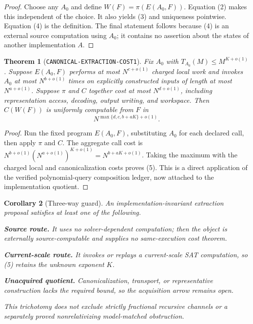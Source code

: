 \documentclass[11pt]{article}
\newtheorem{theorem}{Theorem}
\newtheorem{corollary}[theorem]{Corollary}
\begin{document}
\begin{proof}
Choose any $A_0$ and define $W(F)=\pi(E(A_0,F))$.  Equation (2) makes this
independent of the choice.  It also yields (3) and uniqueness pointwise.
Equation (4) is the definition.  The final statement follows because (4) is
an external source computation using $A_0$; it contains no assertion about
the states of another implementation $A$.
\end{proof}

\begin{theorem}[\texttt{CANONICAL-EXTRACTION-COST1}]
Fix $A_0$ with $T_{A_0}(M)\le M^{K+o(1)}$.  Suppose $E(A_0,F)$ performs at
most $N^{c+o(1)}$ charged local work and invokes $A_0$ at most
$N^{b+o(1)}$ times on explicitly constructed inputs of length at most
$N^{a+o(1)}$.  Suppose $\pi$ and $C$ together cost at most $N^{d+o(1)}$,
including representation access, decoding, output writing, and workspace.
Then $C(W(F))$ is uniformly computable from $F$ in
\[
 \boxed{N^{\max\{d,c,b+aK\}+o(1)}}.                       \tag{5}
\]
\end{theorem}

\begin{proof}
Run the fixed program $E(A_0,F)$, substituting $A_0$ for each declared call,
then apply $\pi$ and $C$.  The aggregate call cost is
$N^{b+o(1)}(N^{a+o(1)})^{K+o(1)}=N^{b+aK+o(1)}$.
Taking the maximum with the charged local and canonicalization costs proves
(5).  This is a direct application of the verified polynomial-query
composition ledger, now attached to the implementation quotient.
\end{proof}

\begin{corollary}[Three-way guard]
An implementation-invariant extraction proposal satisfies at least one of the
following.
\begin{description}[leftmargin=0cm,labelwidth=0cm]
\item[] \textbf{Source route.}  It uses no solver-dependent computation; then
the object is externally source-computable and supplies no same-execution
cost theorem.
\item[] \textbf{Current-scale route.}  It invokes or replays a current-scale
SAT computation, so (5) retains the unknown exponent $K$.
\item[] \textbf{Unacquired quotient.}  Canonicalization, transport, or
representative construction lacks the required bound, so the acquisition
arrow remains open.
\end{description}
This trichotomy does not exclude strictly fractional recursive channels or a
separately proved nonrelativizing model-matched obstruction.
\end{corollary}
\end{document}
